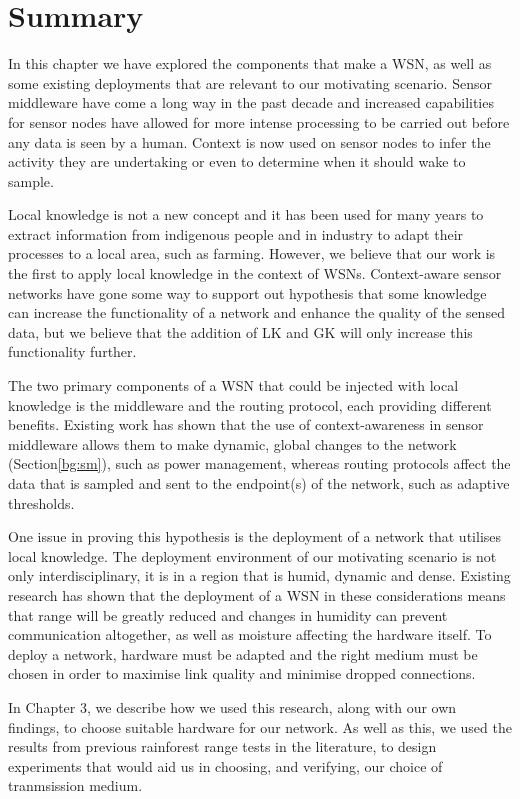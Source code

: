
\section{Summary}
	In this chapter we have explored the components that make a WSN, as well as some existing deployments that are relevant to our motivating scenario. Sensor middleware have come a long way in the past decade and increased capabilities for sensor nodes have allowed for more intense processing to be carried out before any data is seen by a human. Context is now used on sensor nodes to infer the activity they are undertaking or even to determine when it should wake to sample. 

Local knowledge is not a new concept and it has been used for many years to extract information from indigenous people and in industry to adapt their processes to a local area, such as farming. However, we believe that our work is the first to apply local knowledge in the context of WSNs. Context-aware sensor networks have gone some way to support out hypothesis that some knowledge can increase the functionality of a network and enhance the quality of the sensed data, but we believe that the addition of LK and GK will only increase this functionality further.

The two primary components of a WSN that could be injected with local knowledge is the middleware and the routing protocol, each providing different benefits. Existing work has shown that the use of context-awareness in sensor middleware allows them to make dynamic, global changes to the network (Section\ref{bg:sm}), such as power management, whereas routing protocols affect the data that is sampled and sent to the endpoint(s) of the network, such as adaptive thresholds.

One issue in proving this hypothesis is the deployment of a network that utilises local knowledge. The deployment environment of our motivating scenario is not only interdisciplinary, it is in a region that is humid, dynamic and dense. Existing research has shown that the deployment of a WSN in these considerations means that range will be greatly reduced \cite{Figueiredo2009} and changes in humidity can prevent communication altogether, as well as moisture affecting the hardware itself.
To deploy a network, hardware must be adapted and the right medium must be chosen in order to maximise link quality and minimise dropped connections.

In Chapter 3, we describe how we used this research, along with our own findings, to choose suitable hardware for our network. As well as this, we used the results from previous rainforest range tests in the literature, to design  experiments that would aid us in choosing, and verifying, our choice of tranmsission medium.

